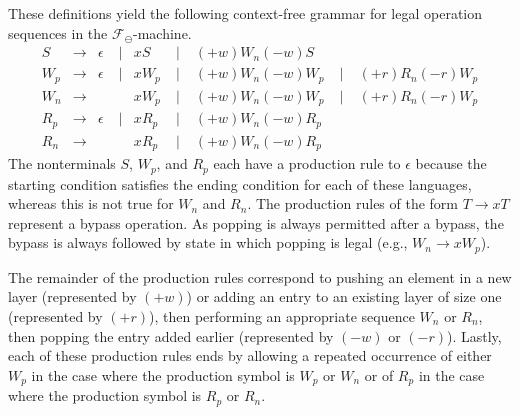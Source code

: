 \documentclass[10pt]{article}
\theoremstyle{plain}
\theoremstyle{definition}
\newcommand{\F}{\mathcal{F}}
\begin{document}
These definitions yield the following context-free grammar for legal operation sequences in the $\F_\ominus$-machine.
%
\[
	\begin{array}{cccclllll}
		S &\longrightarrow & \epsilon & \; |  & xS & \; | \; & (+w)W_n(-w)S &\\
		W_p &\longrightarrow & \epsilon & \; |  & xW_p & \; | \; & (+w)W_n(-w)W_p & \; | \; & (+r)R_n(-r)W_p\\
		W_n &\longrightarrow & & &  xW_p & \; | \; & (+w)W_n(-w)W_p & \; | \; & (+r)R_n(-r)W_p\\
		R_p &\longrightarrow & \epsilon  & \; |  & xR_p &  \; | \; & (+w)W_n(-w)R_p \\
		R_n &\longrightarrow & & & xR_p  & \; | \; & (+w)W_n(-w)R_p
	\end{array}
\]
The nonterminals $S$, $W_p$, and $R_p$ each have a production rule to $\epsilon$ because the starting condition satisfies the ending condition for each of these languages, whereas this is not true for $W_n$ and $R_n$. The production rules of the form $T \longrightarrow xT$ represent a bypass operation. As popping is always permitted after a bypass, the bypass is always followed by state in which popping is legal (e.g., $W_n \longrightarrow xW_p$).

The remainder of the production rules correspond to pushing an element in a new layer (represented by $(+w)$) or adding an entry to an existing layer of size one (represented by $(+r)$), then performing an appropriate sequence $W_n$ or $R_n$, then popping the entry added earlier (represented by $(-w)$ or $(-r)$). Lastly, each of these production rules ends by allowing a repeated occurrence of either $W_p$ in the case where the production symbol is $W_p$ or $W_n$ or of $R_p$ in the case where the production symbol is $R_p$ or $R_n$.
\end{document}
